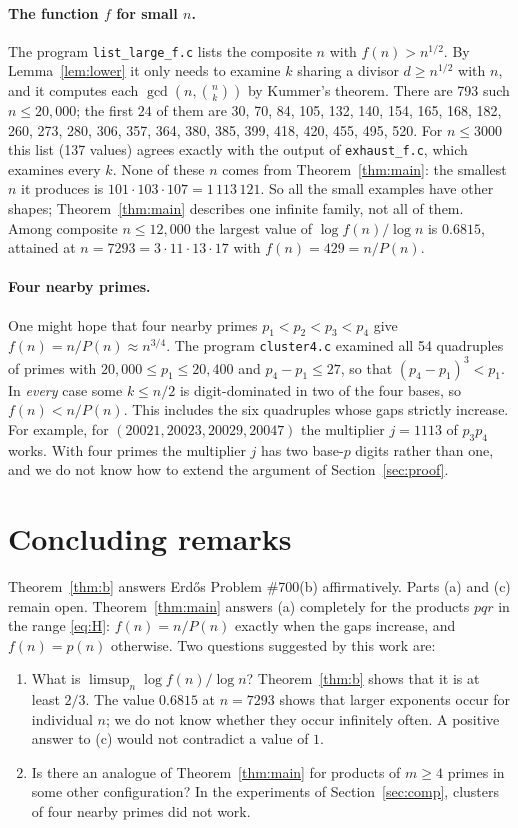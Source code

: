 \documentclass[11pt,a4paper]{article}
\theoremstyle{definition}
\newcommand{\bin}[2]{\binom{#1}{#2}}
\begin{document}
\paragraph{The function $f$ for small $n$.}
The program \texttt{list\_large\_f.c} lists the composite $n$ with $f(n)>n^{1/2}$. By Lemma~\ref{lem:lower} it only needs to examine $k$ sharing a divisor $d\ge n^{1/2}$ with $n$, and it computes each $\gcd(n,\bin nk)$ by Kummer's theorem. There are 793 such $n\le 20{,}000$; the first $24$ of them are 30, 70, 84, 105, 132, 140, 154, 165, 168, 182, 260, 273, 280, 306, 357, 364, 380, 385, 399, 418, 420, 455, 495, 520.
For $n\le3000$ this list (137 values) agrees exactly with the output of \texttt{exhaust\_f.c}, which examines every $k$. None of these $n$ comes from Theorem~\ref{thm:main}: the smallest $n$ it produces is $101\cdot103\cdot107=1\,113\,121$. So all the small examples have other shapes; Theorem~\ref{thm:main} describes one infinite family, not all of them. Among composite $n\le12{,}000$ the largest value of $\log f(n)/\log n$ is $0.6815$, attained at $n=7293=3\cdot11\cdot13\cdot17$ with $f(n)=429=n/P(n)$.

\paragraph{Four nearby primes.}
One might hope that four nearby primes $p_1<p_2<p_3<p_4$ give $f(n)=n/P(n)\approx n^{3/4}$. The program \texttt{cluster4.c} examined all 54 quadruples of primes with $20{,}000\le p_1\le 20{,}400$ and $p_4-p_1\le 27$, so that $(p_4-p_1)^3<p_1$. In \emph{every} case some $k\le n/2$ is digit-dominated in two of the four bases, so $f(n)<n/P(n)$. This includes the six quadruples whose gaps strictly increase. For example, for $(20021,20023,20029,20047)$ the multiplier $j=1113$ of $p_3p_4$ works. With four primes the multiplier $j$ has two base-$p$ digits rather than one, and we do not know how to extend the argument of Section~\ref{sec:proof}.

\section{Concluding remarks}\label{sec:remarks}

Theorem~\ref{thm:b} answers Erd\H{o}s Problem \#700(b) affirmatively. Parts (a) and (c) remain open. Theorem~\ref{thm:main} answers (a) completely for the products $pqr$ in the range \eqref{eq:H}: $f(n)=n/P(n)$ exactly when the gaps increase, and $f(n)=p(n)$ otherwise. Two questions suggested by this work are:
\begin{enumerate}
\item What is $\limsup_{n}\log f(n)/\log n$? Theorem~\ref{thm:b} shows that it is at least $2/3$. The value $0.6815$ at $n=7293$ shows that larger exponents occur for individual $n$; we do not know whether they occur infinitely often. A positive answer to (c) would not contradict a value of $1$.
\item Is there an analogue of Theorem~\ref{thm:main} for products of $m\ge4$ primes in some other configuration? In the experiments of Section~\ref{sec:comp}, clusters of four nearby primes did not work.
\end{enumerate}
\end{document}

